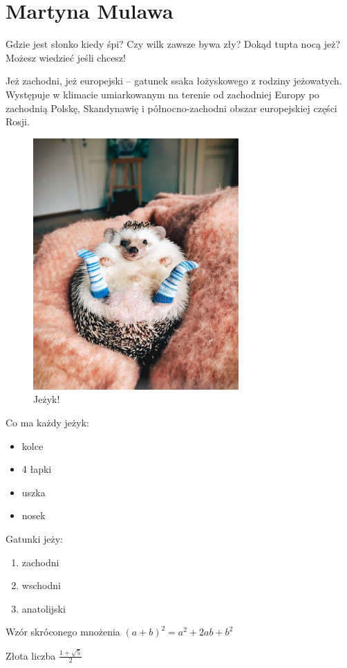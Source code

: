 \section{Martyna Mulawa}
\label{sec:martynamulawa}



\vspace {0.51cm}
\begin{flushleft} Gdzie jest słonko kiedy śpi? Czy wilk zawsze bywa zły? Dokąd tupta nocą jeż? Możesz wiedzieć jeśli chcesz!\end{flushleft}


\begin{flushleft}  Jeż zachodni, jeż europejski – gatunek ssaka łożyskowego z rodziny jeżowatych. Występuje w klimacie umiarkowanym na terenie od zachodniej Europy po zachodnią Polskę, Skandynawię i północno-zachodni obszar europejskiej części Rosji.\end{flushleft}

\begin{figure}[htbp]
    \centering
    \includegraphics[width=0.7\textwidth]{pictures/jezyk.jpg}
    \caption{Jeżyk!}
    \label{fig:jezyk}
\end{figure}

\newpage
\noindent Co ma każdy jeżyk:
\begin{itemize}
  \item kolce
  \item 4  łapki
  \item uszka 
  \item nosek
\end{itemize}

\noindent Gatunki jeży:
\begin{enumerate}
  \item zachodni
  \item wschodni
  \item anatolijski
\end{enumerate}




\noindent Wzór skróconego mnożenia
$ (a+b)^2=a^2+2ab+b^2$

\noindent Złota liczba
$\frac{1+\sqrt5}{2}$



